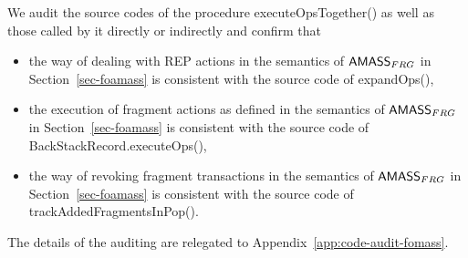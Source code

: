 We audit the source codes of the procedure executeOpsTogether() as well as those called by it directly or indirectly and confirm that 
\begin{itemize}
\item the way of dealing with REP actions in the semantics of $\textsf{AMASS}_{FRG}$ in Section~\ref{sec-foamass} is consistent with the source code of expandOps(), 
\item the execution of fragment actions as defined in the semantics of $\textsf{AMASS}_{FRG}$ in Section~\ref{sec-foamass} is consistent with the source code of BackStackRecord.executeOps(),
\item the way of revoking fragment transactions in the semantics of $\textsf{AMASS}_{FRG}$ in Section~\ref{sec-foamass} is consistent with the source code of trackAddedFragmentsInPop(). 
\end{itemize}
The details of the auditing are relegated to Appendix~\ref{app:code-audit-fomass}.


